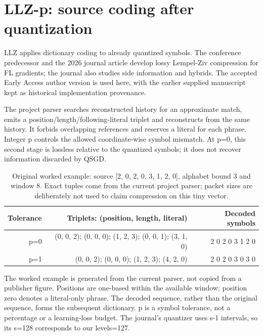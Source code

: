 \section{LLZ-p: source coding after quantization}

LLZ applies dictionary coding to already quantized symbols. The conference predecessor and the 2026 journal article develop lossy Lempel-Ziv compression for FL gradients; the journal also studies side information and hybrids. The accepted Early Access author version is used here, with the earlier supplied manuscript kept as historical implementation provenance. \parencite{zhong2023llz,cao2026llz}

The project parser searches reconstructed history for an approximate match, emits a position/length/following-literal triplet and reconstructs from the same history. It forbids overlapping references and reserves a literal for each phrase. Integer p controls the allowed coordinate-wise symbol mismatch. At p=0, this second stage is lossless relative to the quantized symbols; it does not recover information discarded by QSGD.

\begin{table}[htbp]
\centering
\small
\begin{tabularx}{\textwidth}{R{0.42000}R{1.68000}R{0.90000}}
\toprule
\textbf{Tolerance} & \textbf{Triplets: (position, length, literal)} & \textbf{Decoded symbols} \\\midrule
p=0 & (0, 0, 2); (0, 0, 0); (1, 2, 3); (0, 0, 1); (3, 1, 0) & 2 0 2 0 3 1 2 0 \\
p=1 & (0, 0, 2); (0, 0, 0); (1, 2, 3); (4, 2, 0) & 2 0 2 0 3 0 3 0 \\
\bottomrule
\end{tabularx}
\caption{Original worked example: source [2, 0, 2, 0, 3, 1, 2, 0], alphabet bound 3 and window 8. Exact tuples come from the current project parser; packet sizes are deliberately not used to claim compression on this tiny vector.}
\label{tab:llz-example}
\end{table}

The worked example is generated from the current parser, not copied from a publisher figure. Positions are one-based within the available window; position zero denotes a literal-only phrase. The decoded sequence, rather than the original sequence, forms the subsequent dictionary. p is a symbol tolerance, not a percentage or a learning-loss budget. The journal's quantizer uses s-1 intervals, so its s=128 corresponds to our levels=127.

